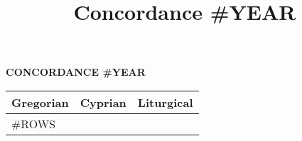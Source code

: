 \documentclass{amsart}
\title{Concordance #YEAR}
\begin{document}
\thispagestyle{empty}

\begin{center}
    \textbf{CONCORDANCE #YEAR}
\end{center}

\begin{table}[h]
    \begin{tabular}{|l|l|l|}
        \hline
        \textbf{Gregorian} & \textbf{Cyprian} & \textbf{Liturgical} \\
        \hline
#ROWS
        \hline
    \end{tabular}
\end{table}
\end{document}
